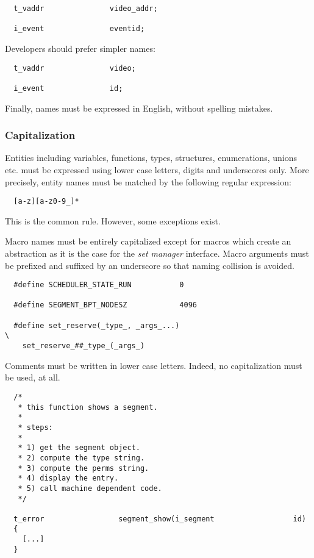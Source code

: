 \begin{verbatim}
  t_vaddr               video_addr;

  i_event               eventid;
\end{verbatim}

Developers should prefer simpler names:

\begin{verbatim}
  t_vaddr               video;

  i_event               id;
\end{verbatim}

Finally, names must be expressed in English, without spelling mistakes.


\subsubsection{Capitalization}

Entities including variables, functions, types, structures, enumerations,
unions etc. must be expressed using lower case letters, digits and underscores
only. More precisely, entity names must be matched by the following
regular expression:

\begin{verbatim}
  [a-z][a-z0-9_]*
\end{verbatim}

This is the common rule. However, some exceptions exist.

Macro names must be entirely capitalized except for macros which create
an abstraction as it is the case for the \textit{set manager} interface. Macro
arguments must be prefixed and suffixed by an underscore so that naming
collision is avoided.

\begin{verbatim}
  #define SCHEDULER_STATE_RUN           0

  #define SEGMENT_BPT_NODESZ            4096

  #define set_reserve(_type_, _args_...)                                \
    set_reserve_##_type_(_args_)
\end{verbatim}

Comments must be written in lower case letters. Indeed, no capitalization
must be used, at all.

\begin{verbatim}
  /*
   * this function shows a segment.
   *
   * steps:
   *
   * 1) get the segment object.
   * 2) compute the type string.
   * 3) compute the perms string.
   * 4) display the entry.
   * 5) call machine dependent code.
   */

  t_error                 segment_show(i_segment                  id)
  {
    [...]
  }
\end{verbatim}

